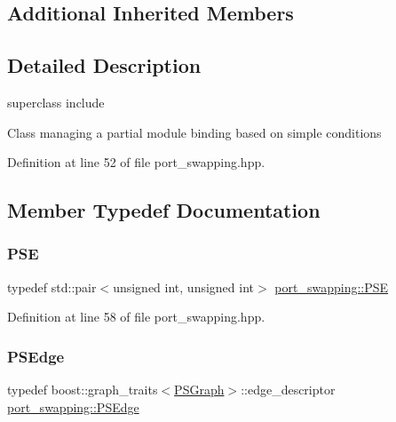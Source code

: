 \subsection*{Additional Inherited Members}


\subsection{Detailed Description}
superclass include 

Class managing a partial module binding based on simple conditions 

Definition at line 52 of file port\+\_\+swapping.\+hpp.



\subsection{Member Typedef Documentation}
\mbox{\label{classport__swapping_ac98b23b7c2dd3f3792327fb666489d66}} 
\subsubsection{\texorpdfstring{P\+SE}{PSE}}
{\footnotesize\ttfamily typedef std\+::pair$<$unsigned int, unsigned int$>$ \hyperlink{classport__swapping_ac98b23b7c2dd3f3792327fb666489d66}{port\+\_\+swapping\+::\+P\+SE}\hspace{0.3cm}{\ttfamily [private]}}



Definition at line 58 of file port\+\_\+swapping.\+hpp.

\mbox{\label{classport__swapping_a76aac644bf41ee5d794ab40f5b8af6a4}} 
\subsubsection{\texorpdfstring{P\+S\+Edge}{PSEdge}}
{\footnotesize\ttfamily typedef boost\+::graph\+\_\+traits$<$\hyperlink{classport__swapping_a77c6a219f0b86bd9340d8354e3fff755}{P\+S\+Graph}$>$\+::edge\+\_\+descriptor \hyperlink{classport__swapping_a76aac644bf41ee5d794ab40f5b8af6a4}{port\+\_\+swapping\+::\+P\+S\+Edge}\hspace{0.3cm}{\ttfamily [private]}}



